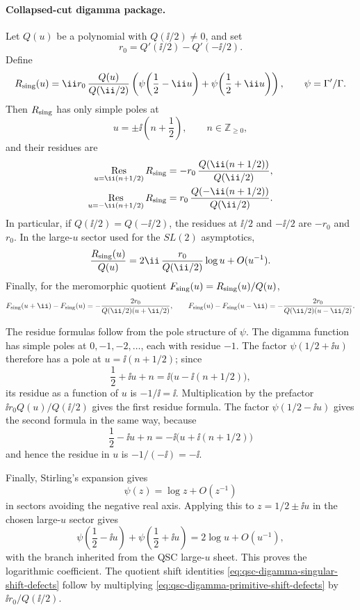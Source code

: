 \paragraph{Collapsed-cut digamma package.}
\label{par:qsc-collapsed-cut-digamma-package}
Let \(Q(u)\) be a polynomial with \(Q(\ii/2)\neq0\), and set
\[
  r_0=Q'(\ii/2)-Q'(-\ii/2).
\]
Define
\begin{equation}
  R_{\rm sing}(u)
  =
  \ii r_0\,\frac{Q(u)}{Q(\ii/2)}
  \left(
    \psi\!\left(\frac12-\ii u\right)
    +\psi\!\left(\frac12+\ii u\right)
  \right),
  \qquad \psi=\Gamma'/\Gamma .
  \label{eq:qsc-digamma-singular-package}
\end{equation}
Then \(R_{\rm sing}\) has only simple poles at
\[
  u=\pm\ii\left(n+\frac12\right),\qquad n\in\mathbb Z_{\ge0},
\]
and their residues are
\[
\begin{aligned}
  \operatorname*{Res}_{u=\ii(n+1/2)}R_{\rm sing}
  &=
  -r_0\,\frac{Q(\ii(n+1/2))}{Q(\ii/2)},\\
  \operatorname*{Res}_{u=-\ii(n+1/2)}R_{\rm sing}
  &=
  r_0\,\frac{Q(-\ii(n+1/2))}{Q(\ii/2)} .
\end{aligned}
\]
In particular, if \(Q(\ii/2)=Q(-\ii/2)\), the residues at
\(\ii/2\) and \(-\ii/2\) are \(-r_0\) and \(r_0\).  In the large-\(u\)
sector used for the \(SL(2)\) asymptotics,
\[
  \frac{R_{\rm sing}(u)}{Q(u)}
  =
  2\ii\,\frac{r_0}{Q(\ii/2)}\log u+O(u^{-1}).
\]
Finally, for the meromorphic quotient \(F_{\rm sing}(u)=R_{\rm sing}(u)/Q(u)\),
\begin{equation}
  F_{\rm sing}(u+\ii)-F_{\rm sing}(u)
  =
  -\frac{2r_0}{Q(\ii/2)(u+\ii/2)},
  \qquad
  F_{\rm sing}(u)-F_{\rm sing}(u-\ii)
  =
  -\frac{2r_0}{Q(\ii/2)(u-\ii/2)} .
  \label{eq:qsc-digamma-singular-shift-defects}
\end{equation}

The residue formulas follow from the pole structure of \(\psi\).  The
digamma function has simple poles at \(0,-1,-2,\ldots\), each with residue
\(-1\).  The factor
\(\psi(1/2+\ii u)\) therefore has a pole at
\(u=\ii(n+1/2)\); since
\[
  \frac12+\ii u+n=\ii\bigl(u-\ii(n+1/2)\bigr),
\]
its residue as a function of \(u\) is \(-1/\ii=\ii\).  Multiplication by
the prefactor \(\ii r_0Q(u)/Q(\ii/2)\) gives the first residue formula.
The factor \(\psi(1/2-\ii u)\) gives the second formula in the same way,
because
\[
  \frac12-\ii u+n=-\ii\bigl(u+\ii(n+1/2)\bigr)
\]
and hence the residue in \(u\) is \(-1/(-\ii)=-\ii\).

Finally, Stirling's expansion gives
\[
  \psi(z)=\log z+O(z^{-1})
\]
in sectors avoiding the negative real axis.  Applying this to
\(z=1/2\pm\ii u\) in the chosen large-\(u\) sector gives
\[
  \psi\!\left(\frac12-\ii u\right)
  +\psi\!\left(\frac12+\ii u\right)
  =
  2\log u+O(u^{-1}),
\]
with the branch inherited from the QSC large-\(u\) sheet.  This proves the
logarithmic coefficient.  The quotient shift identities
\eqref{eq:qsc-digamma-singular-shift-defects} follow by multiplying
\eqref{eq:qsc-digamma-primitive-shift-defects} by \(\ii r_0/Q(\ii/2)\).

